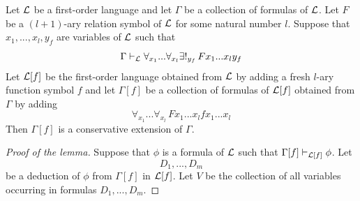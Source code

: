 \documentclass[10pt]{amsart}
\begin{document}
\begin{lemma}\label{lemma:extension_by_single_definite_description_of_function_is_conservative}
	Let ${\mathcal L}$ be a first-order language and let $\Gamma$ be a collection of formulas of ${\mathcal L}$. Let $F$ be a $(l+1)$-ary relation symbol of ${\mathcal L}$ for some natural number $l$. Suppose that $x_1,...,x_l,y_f$ are variables of ${\mathcal L}$ such that
  $$\Gamma \vdash_{{\mathcal L}} \forall_{x_1}...\forall_{x_l}\exists!_{y_f}\,Fx_1...x_ly_f$$
	Let ${\mathcal L}[f]$ be the first-order language obtained from ${\mathcal L}$ by adding a fresh $l$-ary function symbol $f$ and let $\Gamma[f]$ be a collection of formulas of ${\mathcal L}[f]$ obtained from $\Gamma$ by adding
	$$\forall_{x_1}...\forall_{x_{l}}\,Fx_1...x_lfx_1...x_l$$
	Then $\Gamma[f]$ is a conservative extension of $\Gamma$.
\end{lemma}
\begin{proof}[Proof of the lemma]
	Suppose that $\phi$ is a formula of ${\mathcal L}$ such that $\Gamma[f] \vdash_{{\mathcal L}[f]}\phi$. Let
	$$D_1,...,D_m$$
	be a deduction of $\phi$ from $\Gamma[f]$ in ${\mathcal L}[f]$. Let $V$ be the collection of all variables occurring in formulas $D_1,...,D_m$.


\end{proof}
\end{document}
